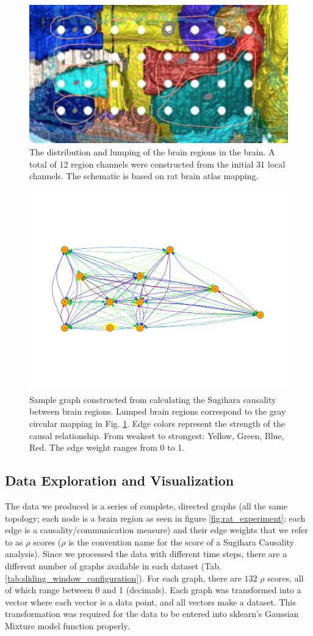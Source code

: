 \documentclass[journal,12pt,onecolumn,draftclsnofoot]{IEEEtran}  %
\begin{document}
\begin{figure}[H]
  \centering
  \includegraphics[width=0.65\linewidth]{figures/brain_region_lump.png}
  \caption{The distribution and lumping of the brain regions in the brain. A total of 12 region channels were constructed from the initial 31 local channels. The schematic is based on rat brain atlas mapping.}
  \label{fig:brain_region_lumping}
\end{figure}


\begin{figure}[H]
  \centering
  \includegraphics[width=0.55\linewidth]{figures/sample_graph.pdf}
  \caption{Sample graph constructed from calculating the Sugihara causality between brain regions. Lumped brain regions correspond to the gray circular mapping in Fig. \ref{fig:brain_region_lumping}. Edge colors represent the strength of the causal relationship. From weakest to strongest: Yellow, Green, Blue, Red. The edge weight ranges from 0 to 1.}
  \label{fig:sample_graph}
\end{figure}


\subsection{Data Exploration and Visualization}
The data we produced is a series of complete, directed graphs (all the same topology; each node is a brain region as seen in figure \ref{fig:rat_experiment}; each edge is a causality/communication measure) and their edge weights that we refer to as $\rho$ scores ($\rho$ is the convention name for the score of a Sugihara Causality analysis). Since we processed the data with different time steps, there are a different number of graphs available in each dataset (Tab. \ref{tab:sliding_window_configuration}). For each graph, there are $132$ $\rho$ scores, all of which range between 0 and 1 (decimals). Each graph was transformed into a vector where each vector is a data point, and all vectors make a dataset. This transformation was required for the data to be entered into sklearn's Gaussian Mixture model function properly.
\end{document}
